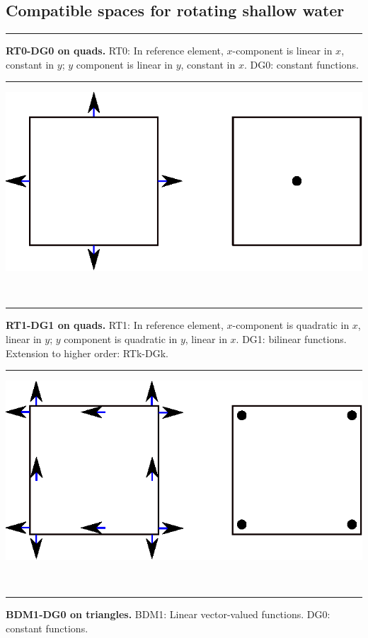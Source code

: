 \documentclass[landscape]{imposter}
\begin{document}
\begin{multicols*}{3}
\section{Compatible spaces for rotating shallow water}
\parbox{25cm}{\hrule height 0pt width 0pt
  {\bfseries RT0-DG0 on quads.}
RT0: In reference element, $x$-component is linear in $x$, constant in
$y$; $y$ component is linear in $y$, constant in
$x$. DG0: constant functions.}
\hspace{1cm}
\parbox{5cm}
       {\hrule height 0pt width 0pt \includegraphics{RT0Q0DOFS}}
       \vspace{1cm} \\
\parbox{25cm}{\hrule height 0pt width 0pt {\bfseries RT1-DG1 on quads.}
RT1: In reference element, $x$-component is quadratic in $x$, linear in
$y$; $y$ component is quadratic in $y$, linear in
$x$. DG1: bilinear functions. Extension to higher order: RTk-DGk.}
\hspace{1cm}
\parbox{25cm}{\hrule height 0pt width 0pt \includegraphics{RT1Q1DOFS}}
\vspace{1cm} \\
\parbox{25cm}{\hrule height 0pt width 0pt {\bfseries BDM1-DG0 on triangles.}
  BDM1: Linear vector-valued functions. DG0: constant functions.}
\hspace{1cm}

\end{multicols*}
\end{document}

